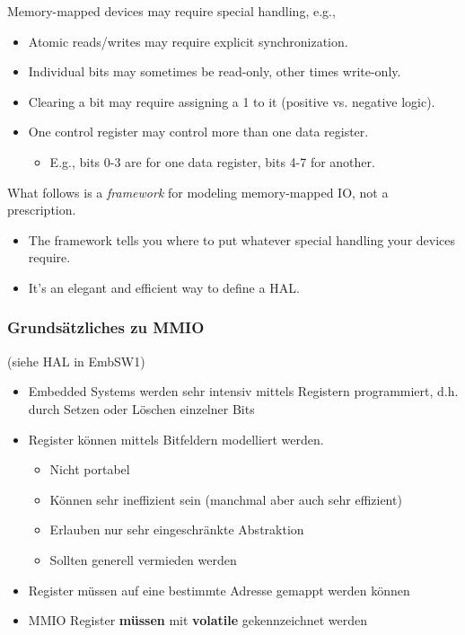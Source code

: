 Memory-mapped devices may require special handling, e.g.,
\begin{itemize}
  \item Atomic reads/writes may require explicit synchronization.
  \item Individual bits may sometimes be read-only, other times write-only.
  \item Clearing a bit may require assigning a 1 to it (positive vs. negative logic).
  \item One control register may control more than one data register.
  \begin{itemize}
    \item E.g., bits 0-3 are for one data register, bits 4-7 for another.
  \end{itemize}
\end{itemize}
What follows is a \textit{framework} for modeling memory-mapped IO, not a prescription.
\begin{itemize}
  \item The framework tells you where to put whatever special handling your devices require.
  \item It's an elegant and efficient way to define a HAL.
\end{itemize}

\subsubsection{Grundsätzliches zu MMIO}
(siehe HAL in EmbSW1)
\begin{itemize}
  \item Embedded Systems werden sehr intensiv mittels Registern programmiert, d.h. durch Setzen oder Löschen einzelner Bits
  \item Register können mittels Bitfeldern modelliert werden.
  \begin{itemize}
    \item Nicht portabel
    \item Können sehr ineffizient sein (manchmal aber auch sehr effizient)
    \item Erlauben nur sehr eingeschränkte Abstraktion
    \item Sollten generell vermieden werden
  \end{itemize}
  \item Register müssen auf eine bestimmte Adresse gemappt werden können
  \item MMIO Register \textbf{müssen} mit \textbf{volatile} gekennzeichnet werden
\end{itemize}

